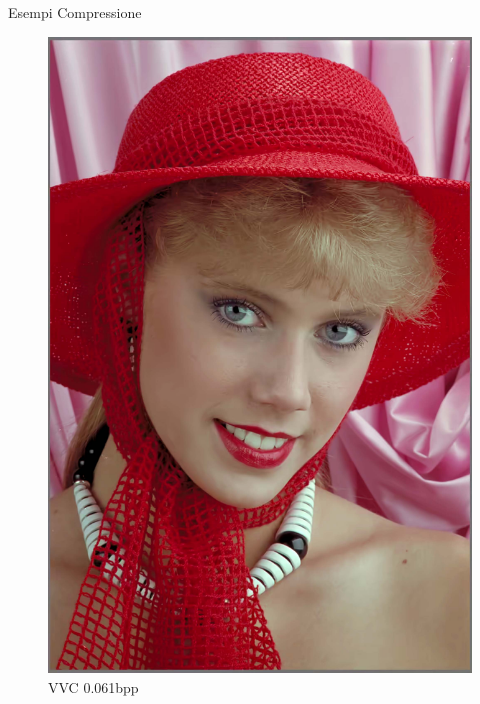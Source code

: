 \begin{frame}{Esempi Compressione}
\begin{figure}[!ht]
\begin{minipage}[]{0.13\linewidth}
                \includegraphics[width=\textwidth]{Immagini/IMAGES/VVC_1_IMG0004.pdf}
                \caption{VVC 0.061bpp}
                \label{fig:ExampleVVC}
            \end{minipage}
            \begin{minipage}[]{0.13\linewidth}
                \centering

\end{minipage}
\end{figure}
\end{frame}
